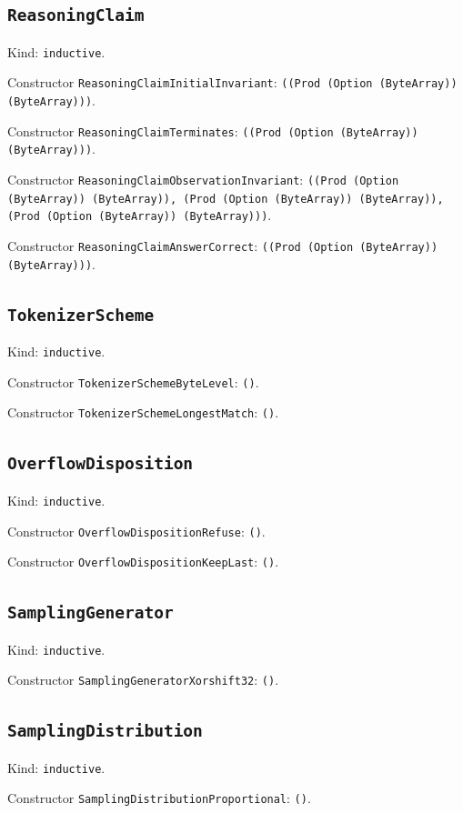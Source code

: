 \documentclass[11pt]{article}
\begin{document}
\subsection*{\texttt{ReasoningClaim}}
\noindent Kind: \texttt{inductive}.\par
\noindent Constructor \texttt{ReasoningClaimInitialInvariant}: \texttt{((Prod (Option (ByteArray)) (ByteArray)))}.\par
\noindent Constructor \texttt{ReasoningClaimTerminates}: \texttt{((Prod (Option (ByteArray)) (ByteArray)))}.\par
\noindent Constructor \texttt{ReasoningClaimObservationInvariant}: \texttt{((Prod (Option (ByteArray)) (ByteArray)), (Prod (Option (ByteArray)) (ByteArray)), (Prod (Option (ByteArray)) (ByteArray)))}.\par
\noindent Constructor \texttt{ReasoningClaimAnswerCorrect}: \texttt{((Prod (Option (ByteArray)) (ByteArray)))}.\par
\subsection*{\texttt{TokenizerScheme}}
\noindent Kind: \texttt{inductive}.\par
\noindent Constructor \texttt{TokenizerSchemeByteLevel}: \texttt{()}.\par
\noindent Constructor \texttt{TokenizerSchemeLongestMatch}: \texttt{()}.\par
\subsection*{\texttt{OverflowDisposition}}
\noindent Kind: \texttt{inductive}.\par
\noindent Constructor \texttt{OverflowDispositionRefuse}: \texttt{()}.\par
\noindent Constructor \texttt{OverflowDispositionKeepLast}: \texttt{()}.\par
\subsection*{\texttt{SamplingGenerator}}
\noindent Kind: \texttt{inductive}.\par
\noindent Constructor \texttt{SamplingGeneratorXorshift32}: \texttt{()}.\par
\subsection*{\texttt{SamplingDistribution}}
\noindent Kind: \texttt{inductive}.\par
\noindent Constructor \texttt{SamplingDistributionProportional}: \texttt{()}.\par
\end{document}
